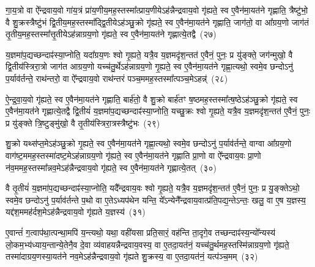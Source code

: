 {\anuvakamend[{प्र॒मीये॑त मनु॒ष्य॑ ऋध्यते॒ यस्य॑ पि॒ता पि॑ताम॒हः पुण्यो॒ वाग्वा ए॒व पू॒र्णान्ग्रहा॒न्पञ्च॑विꣳशतिश्च}]}

गा॒य॒त्रो वा ऐ᳚न्द्रवाय॒वो गा॑य॒त्रं प्रा॑य॒णीय॒मह॒स्तस्मा᳚त्प्राय॒णीये\-ऽह॑न्नैन्द्रवाय॒वो गृ॑ह्यते॒ स्व ए॒वैन॑मा॒यत॑ने गृह्णाति॒ त्रैष्टु॑भो॒ वै शु॒क्रस्त्रैष्टु॑भं द्वि॒तीय॒मह॒स्तस्मा᳚द्\-द्वि॒तीये\-ऽह॑ञ्छु॒क्रो गृ॑ह्यते॒ स्व ए॒वैन॑मा॒यत॑ने गृह्णाति॒ जाग॑तो॒ वा आ᳚ग्रय॒णो जाग॑तं तृ॒तीय॒मह॒स्तस्मा᳚त्तृ॒तीये\-ऽह॑न्नाग्रय॒णो गृ॑ह्यते॒ स्व ए॒वैन॑मा॒यत॑ने गृह्णात्ये॒तद्वै~(२७)\ip

य॒ज्ञमा॑प॒द्यच्छन्दाꣴ॑स्या॒प्नोति॒ यदा᳚ग्रय॒णः श्वो गृ॒ह्यते॒ यत्रै॒व य॒ज्ञमदृ॑श॒न्तत॑ ए॒वैनं॒ पुनः॒ प्र यु॑ङ्क्ते॒ जग॑न्मुखो॒ वै द्वि॒तीय॑स्त्रिरा॒त्रो जाग॑त आग्रय॒णो यच्च॑तु॒र्थे\-ऽह॑न्नाग्रय॒णो गृ॒ह्यते॒ स्व ए॒वैन॑मा॒यत॑ने गृह्णा॒त्यथो॒ स्वमे॒व छन्दो\-ऽनु॑ प॒र्याव॑र्तन्ते॒ राथ॑न्तरो॒ वा ऐ᳚न्द्रवाय॒वो राथ॑न्तरं पञ्च॒ममह॒स्तस्मा᳚त्पञ्च॒मे\-ऽहन्न्॑~(२८)\ip

ऐ॒न्द्र॒वा॒य॒वो गृ॑ह्यते॒ स्व ए॒वैन॑मा॒यत॑ने गृह्णाति॒ बार्\mbox{}ह॑तो॒ वै शु॒क्रो बार्\mbox{}ह॑तꣳ ष॒ष्ठमह॒स्तस्मा᳚त्ष॒ष्ठे\-ऽह॑ञ्छु॒क्रो गृ॑ह्यते॒ स्व ए॒वैन॑मा॒यत॑ने गृह्णात्ये॒तद्वै द्वि॒तीयं॑ य॒ज्ञमा॑प॒द्यच्छन्दाꣴ॑स्या॒प्नोति॒ यच्छु॒क्रः श्वो गृ॒ह्यते॒ यत्रै॒व य॒ज्ञमदृ॑श॒न्तत॑ ए॒वैनं॒ पुनः॒ प्र यु॑ङ्क्ते त्रि॒ष्टुङ्मु॑खो॒ वै तृ॒तीय॑स्त्रिरा॒त्रस्त्रैष्टु॑भः~(२९)\ip

शु॒क्रो यथ्स॑प्त॒मे\-ऽह॑ञ्छु॒क्रो गृ॒ह्यते॒ स्व ए॒वैन॑मा॒यत॑ने गृह्णा॒त्यथो॒ स्वमे॒व छन्दो\-ऽनु॑ प॒र्याव॑र्तन्ते॒ वाग्वा आ᳚ग्रय॒णो वाग॑ष्ट॒ममह॒स्तस्मा॑दष्ट॒मे\-ऽह॑न्नाग्रय॒णो गृ॑ह्यते॒ स्व ए॒वैन॑मा॒यत॑ने गृह्णाति प्रा॒णो वा ऐ᳚न्द्रवाय॒वः प्रा॒णो न॑व॒ममह॒स्तस्मा᳚न्नव॒मे\-ऽह॑न्नैन्द्रवाय॒वो गृ॑ह्यते॒ स्व ए॒वैन॑मा॒यत॑ने गृह्णात्ये॒तत्~(३०)\ip

वै तृ॒तीयं॑ य॒ज्ञमा॑प॒द्यच्छन्दाꣴ॑स्या॒प्नोति॒ यदै᳚न्द्रवाय॒वः श्वो गृ॒ह्यते॒ यत्रै॒व य॒ज्ञमदृ॑श॒न्तत॑ ए॒वैनं॒ पुनः॒ प्र यु॒ङ्क्ते\-ऽथो॒ स्वमे॒व छन्दो\-ऽनु॑ प॒र्याव॑र्तन्ते प॒थो वा ए॒ते\-ऽध्यप॑थेन यन्ति॒ ये᳚\-ऽन्येनै᳚न्द्रवाय॒वात्प्र॑ति॒पद्य॒न्ते\-ऽन्तः॒ खलु॒ वा ए॒ष य॒ज्ञस्य॒ यद्द॑श॒ममह॑र्दश॒मे\-ऽह॑न्नैन्द्रवाय॒वो गृ॑ह्यते य॒ज्ञस्य॑~(३१)\ip

ए॒वान्तं॑ ग॒त्वाप॑था॒त्पन्था॒मपि॑ य॒न्त्यथो॒ यथा॒ वही॑यसा प्रति॒सारं॒ वह॑न्ति ता॒दृगे॒व तच्छन्दाꣴ॑स्य॒न्यो᳚न्यस्य॑ लो॒कम॒भ्य॑ध्याय॒न्तान्ये॒तेनै॒व दे॒वा व्य॑वाहयन्नैन्द्रवाय॒वस्य॒ वा ए॒तदा॒यत॑नं॒ यच्च॑तु॒र्थमह॒स्तस्मि॑न्नाग्रय॒णो गृ॑ह्यते॒ तस्मा॑दाग्रय॒णस्या॒यत॑ने नव॒मे\-ऽह॑न्नैन्द्रवाय॒वो गृ॑ह्यते शु॒क्रस्य॒ वा ए॒तदा॒यत॑नं॒ यत्प॑ञ्च॒मम्~(३२)\ip

